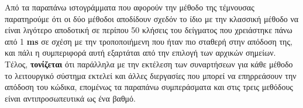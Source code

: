 \documentclass[First Project.tex]{subfiles}
\begin{document}
\vspace{5mm}
\begin{figure}[h!]
    \centering
    \quad
\end{figure}

Από τα παραπάνω ιστογράμματα που αφορούν την μέθοδο της τέμνουσας παρατηρούμε ότι οι δύο μέθοδοι αποδίδουν σχεδόν το ίδιο με την κλασσική
μέθοδο να είναι λιγότερο αποδοτική σε περίπου 50 κλήσεις του δείγματος που χρειάστηκε πάνω από 1 \textlatin{\textbf{ms}} σε σχέση 
με την τροποποιήμενη που ήταν πιο σταθερή στην απόδοση της, και πάλι η συμπεριφορά αυτή εξαρτάται από την επιλογή των αρχικών σημείων. Τέλος,
\textbf{τονίζεται} ότι παράλληλα με την εκτέλεση των συναρτήσεων για κάθε μέθοδο το λειτουργικό σύστημα εκτελεί και άλλες διεργασίες που 
μπορεί να επηρρεάσουν την απόδοση του κώδικα, επομένως τα παραπάνω συμπεράσματα και στις τρεις μεθόδους είναι αντιπροσωπευτικά ως ένα βαθμό.
\end{document}
